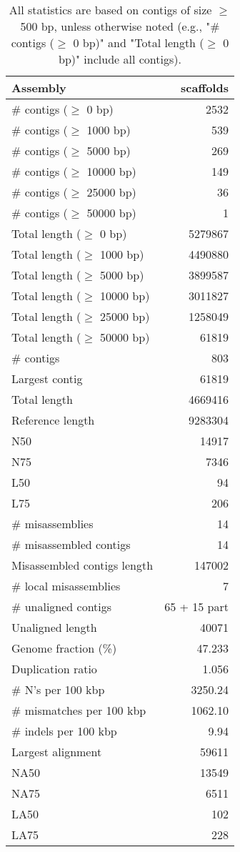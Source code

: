 \documentclass[12pt,a4paper]{article}
\begin{document}
\begin{table}[ht]
\begin{center}
\caption{All statistics are based on contigs of size $\geq$ 500 bp, unless otherwise noted (e.g., "\# contigs ($\geq$ 0 bp)" and "Total length ($\geq$ 0 bp)" include all contigs).}
\begin{tabular}{|l*{1}{|r}|}
\hline
Assembly & scaffolds \\ \hline
\# contigs ($\geq$ 0 bp) & 2532 \\ \hline
\# contigs ($\geq$ 1000 bp) & 539 \\ \hline
\# contigs ($\geq$ 5000 bp) & 269 \\ \hline
\# contigs ($\geq$ 10000 bp) & 149 \\ \hline
\# contigs ($\geq$ 25000 bp) & 36 \\ \hline
\# contigs ($\geq$ 50000 bp) & 1 \\ \hline
Total length ($\geq$ 0 bp) & 5279867 \\ \hline
Total length ($\geq$ 1000 bp) & 4490880 \\ \hline
Total length ($\geq$ 5000 bp) & 3899587 \\ \hline
Total length ($\geq$ 10000 bp) & 3011827 \\ \hline
Total length ($\geq$ 25000 bp) & 1258049 \\ \hline
Total length ($\geq$ 50000 bp) & 61819 \\ \hline
\# contigs & 803 \\ \hline
Largest contig & 61819 \\ \hline
Total length & 4669416 \\ \hline
Reference length & 9283304 \\ \hline
N50 & 14917 \\ \hline
N75 & 7346 \\ \hline
L50 & 94 \\ \hline
L75 & 206 \\ \hline
\# misassemblies & 14 \\ \hline
\# misassembled contigs & 14 \\ \hline
Misassembled contigs length & 147002 \\ \hline
\# local misassemblies & 7 \\ \hline
\# unaligned contigs & 65 + 15 part \\ \hline
Unaligned length & 40071 \\ \hline
Genome fraction (\%) & 47.233 \\ \hline
Duplication ratio & 1.056 \\ \hline
\# N's per 100 kbp & 3250.24 \\ \hline
\# mismatches per 100 kbp & 1062.10 \\ \hline
\# indels per 100 kbp & 9.94 \\ \hline
Largest alignment & 59611 \\ \hline
NA50 & 13549 \\ \hline
NA75 & 6511 \\ \hline
LA50 & 102 \\ \hline
LA75 & 228 \\ \hline
\end{tabular}
\end{center}
\end{table}
\end{document}
